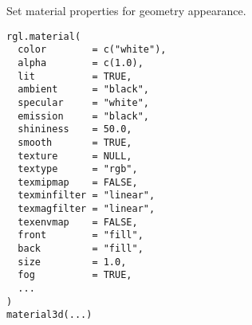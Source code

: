 \documentclass{article}
\begin{document}
\begin{Description}\relax
Set material properties for geometry appearance.
\end{Description}
\begin{Usage}
\begin{verbatim}
rgl.material(
  color        = c("white"),
  alpha        = c(1.0),
  lit          = TRUE, 
  ambient      = "black",
  specular     = "white", 
  emission     = "black", 
  shininess    = 50.0, 
  smooth       = TRUE,
  texture      = NULL, 
  textype      = "rgb", 
  texmipmap    = FALSE, 
  texminfilter = "linear", 
  texmagfilter = "linear",
  texenvmap    = FALSE,
  front        = "fill", 
  back         = "fill",
  size         = 1.0, 
  fog          = TRUE, 
  ...
)
material3d(...)
\end{verbatim}
\end{Usage}
\end{document}
